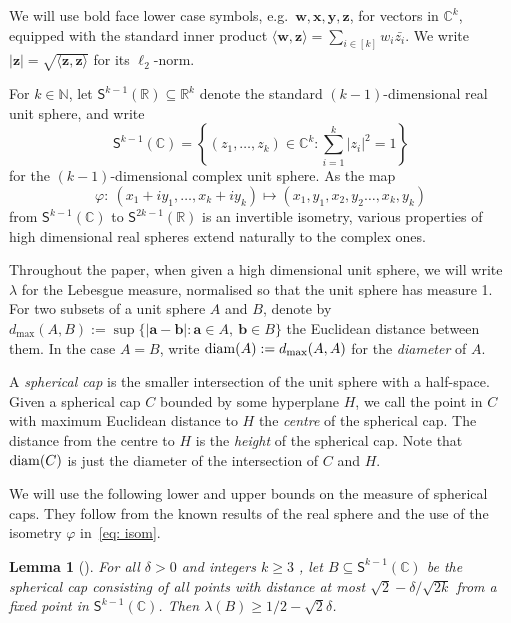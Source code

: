 \documentclass[10pt,a4paper]{article}
\newcommand\innerp[1]{\langle #1 \rangle}
\newcommand{\V}[1]{\mathbold{#1}}
\newtheorem{lemma}[theorem]{Lemma}
\theoremstyle{definition}
\newcommand{\diam}[1]{{\rm{diam}}(#1)}
\newcommand{\sS}{\mathsf{S}}
\newcommand{\sN}{\mathbb{N}}
\newcommand{\sC}{\mathbb{C}}
\newcommand{\sR}{\mathbb{R}}
\begin{document}
We will use bold face lower case symbols, e.g.~$\V{w}, \V{x}, \V{y}, \V{z}$, for vectors in $\sC^{k}$, equipped with the standard inner product $\innerp{\V{w},\V{z}}=\sum_{i\in [k]}w_i\bar{z_i}$. We write $|\V{z}|=\sqrt{\innerp{\V{z},\V{z}}}$ for its $\ell_2$-norm.

For $k\in\sN$, let $\sS^{k-1}(\sR)\subseteq \sR^{k}$ denote the standard $(k-1)$-dimensional real unit sphere, and write
$$\sS^{k-1}(\sC)=\left\{(z_1,\ldots, z_{k})\in\sC^{k}: \sum_{i=1}^{k}|z_i|^2=1\right\}$$
for the $(k-1)$-dimensional complex unit sphere.  As the map
\begin{equation}\label{eq: isom}
	\varphi:~ (x_1+iy_1,\ldots, x_k+iy_k)\longmapsto (x_1,y_1,x_2,y_2\ldots,x_k,y_k)
\end{equation}
from $\sS^{k-1}(\sC)$ to $\sS^{2k-1}(\sR)$ is an invertible isometry, various properties of high dimensional real spheres extend naturally to the complex ones.


Throughout the paper, when given a high dimensional unit sphere, we will write $\lambda$ for the Lebesgue measure, normalised so that the unit sphere has measure 1. For two subsets of a unit sphere $A$ and $B$, denote by $d_{\max}(A,B):=\sup\{|\V{a}-\V{b}|: \V{a}\in A,~\V{b}\in B \}$ the Euclidean distance between them. In the case $A=B$, write $\diam{A}:=d_{\max}(A,A)$ for the \emph{diameter} of $A$.  

A \emph{spherical cap} is the smaller intersection of the unit sphere with a half-space. Given a spherical cap $C$ bounded by some hyperplane $H$, we call the point in $C$ with maximum Euclidean distance to $H$ the \emph{centre} of the spherical cap. The distance from the centre to $H$ is the \emph{height} of the spherical cap. Note that $\diam{C}$ is just the diameter of the intersection of $C$ and $H$. 

We will use the following lower and upper bounds on the measure of spherical caps. They follow from the known results of the real sphere and the use of the isometry $\varphi$ in~\eqref{eq: isom}.



\begin{lemma}[\cite{BL-1}]\label{lem:cap-LB}
	For all $\delta>0$ and integers $k\ge 3$ , let $B\subseteq \sS^{k-1}(\sC)$ be the spherical cap consisting of all points with distance at most $\sqrt{2}-\delta/\sqrt{2k}$ from a fixed point in $\sS^{k-1}(\sC)$. Then $\lambda(B)\ge 1/2-\sqrt{2}\delta$.
\end{lemma}

\end{document}
